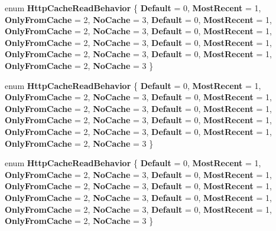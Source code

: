 \begin{DoxyCompactItemize}
enum {\bfseries Http\+Cache\+Read\+Behavior} \{ \newline
{\bfseries Default} = 0, 
{\bfseries Most\+Recent} = 1, 
{\bfseries Only\+From\+Cache} = 2, 
{\bfseries No\+Cache} = 3, 
\newline
{\bfseries Default} = 0, 
{\bfseries Most\+Recent} = 1, 
{\bfseries Only\+From\+Cache} = 2, 
{\bfseries No\+Cache} = 3, 
\newline
{\bfseries Default} = 0, 
{\bfseries Most\+Recent} = 1, 
{\bfseries Only\+From\+Cache} = 2, 
{\bfseries No\+Cache} = 3, 
\newline
{\bfseries Default} = 0, 
{\bfseries Most\+Recent} = 1, 
{\bfseries Only\+From\+Cache} = 2, 
{\bfseries No\+Cache} = 3, 
\newline
{\bfseries Default} = 0, 
{\bfseries Most\+Recent} = 1, 
{\bfseries Only\+From\+Cache} = 2, 
{\bfseries No\+Cache} = 3
 \}
\item 
\mbox{\label{namespace_windows_1_1_web_1_1_http_1_1_filters_a48b2ac096c830c3e320549dc7073620e}} 
enum {\bfseries Http\+Cache\+Read\+Behavior} \{ \newline
{\bfseries Default} = 0, 
{\bfseries Most\+Recent} = 1, 
{\bfseries Only\+From\+Cache} = 2, 
{\bfseries No\+Cache} = 3, 
\newline
{\bfseries Default} = 0, 
{\bfseries Most\+Recent} = 1, 
{\bfseries Only\+From\+Cache} = 2, 
{\bfseries No\+Cache} = 3, 
\newline
{\bfseries Default} = 0, 
{\bfseries Most\+Recent} = 1, 
{\bfseries Only\+From\+Cache} = 2, 
{\bfseries No\+Cache} = 3, 
\newline
{\bfseries Default} = 0, 
{\bfseries Most\+Recent} = 1, 
{\bfseries Only\+From\+Cache} = 2, 
{\bfseries No\+Cache} = 3, 
\newline
{\bfseries Default} = 0, 
{\bfseries Most\+Recent} = 1, 
{\bfseries Only\+From\+Cache} = 2, 
{\bfseries No\+Cache} = 3
 \}
\item 
\mbox{\label{namespace_windows_1_1_web_1_1_http_1_1_filters_a48b2ac096c830c3e320549dc7073620e}} 
enum {\bfseries Http\+Cache\+Read\+Behavior} \{ \newline
{\bfseries Default} = 0, 
{\bfseries Most\+Recent} = 1, 
{\bfseries Only\+From\+Cache} = 2, 
{\bfseries No\+Cache} = 3, 
\newline
{\bfseries Default} = 0, 
{\bfseries Most\+Recent} = 1, 
{\bfseries Only\+From\+Cache} = 2, 
{\bfseries No\+Cache} = 3, 
\newline
{\bfseries Default} = 0, 
{\bfseries Most\+Recent} = 1, 
{\bfseries Only\+From\+Cache} = 2, 
{\bfseries No\+Cache} = 3, 
\newline
{\bfseries Default} = 0, 
{\bfseries Most\+Recent} = 1, 
{\bfseries Only\+From\+Cache} = 2, 
{\bfseries No\+Cache} = 3, 
\newline
{\bfseries Default} = 0, 
{\bfseries Most\+Recent} = 1, 
{\bfseries Only\+From\+Cache} = 2, 
{\bfseries No\+Cache} = 3
 \}
\end{DoxyCompactItemize}
